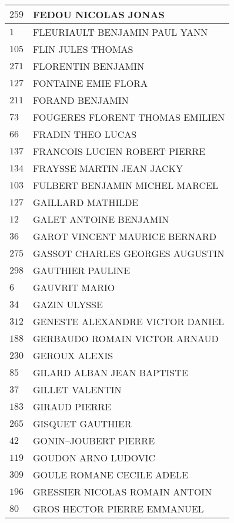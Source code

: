 \begin{xltabular}{\linewidth}{|l|X|}
    \hline
    $259$ & FEDOU NICOLAS JONAS \\
    \hline
    $1$ & FLEURIAULT BENJAMIN PAUL YANN \\
    \hline
    $105$ & FLIN JULES THOMAS \\
    \hline
    $271$ & FLORENTIN BENJAMIN \\
    \hline
    $127$ & FONTAINE EMIE FLORA \\
    \hline
    $211$ & FORAND BENJAMIN \\
    \hline
    $73$ & FOUGERES FLORENT THOMAS EMILIEN \\
    \hline
    $66$ & FRADIN THEO LUCAS \\
    \hline
    $137$ & FRANCOIS LUCIEN ROBERT PIERRE \\
    \hline
    $134$ & FRAYSSE MARTIN JEAN JACKY \\
    \hline
    $103$ & FULBERT BENJAMIN MICHEL MARCEL \\
    \hline
    $127$ & GAILLARD MATHILDE \\
    \hline
    $12$ & GALET ANTOINE BENJAMIN \\
    \hline
    $36$ & GAROT VINCENT MAURICE BERNARD \\
    \hline
    $275$ & GASSOT CHARLES GEORGES AUGUSTIN \\
    \hline
    $298$ & GAUTHIER PAULINE \\
    \hline
    $6$ & GAUVRIT MARIO \\
    \hline
    $34$ & GAZIN ULYSSE \\
    \hline
    $312$ & GENESTE ALEXANDRE VICTOR DANIEL \\
    \hline
    $188$ & GERBAUDO ROMAIN VICTOR ARNAUD \\
    \hline
    $230$ & GEROUX ALEXIS \\
    \hline
    $85$ & GILARD ALBAN JEAN BAPTISTE \\
    \hline
    $37$ & GILLET VALENTIN \\
    \hline
    $183$ & GIRAUD PIERRE \\
    \hline
    $265$ & GISQUET GAUTHIER \\
    \hline
    $42$ & GONIN--JOUBERT PIERRE \\
    \hline
    $119$ & GOUDON ARNO LUDOVIC \\
    \hline
    $309$ & GOULE ROMANE CECILE ADELE \\
    \hline
    $196$ & GRESSIER NICOLAS ROMAIN ANTOIN \\
    \hline
    $80$ & GROS HECTOR PIERRE EMMANUEL \\

\end{xltabular}

